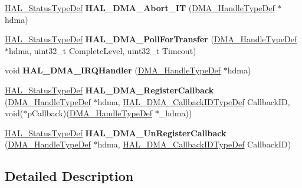 \begin{DoxyCompactItemize}
\hyperlink{stm32f0xx__hal__def_8h_a63c0679d1cb8b8c684fbb0632743478f}{H\+A\+L\+\_\+\+Status\+Type\+Def} {\bfseries H\+A\+L\+\_\+\+D\+M\+A\+\_\+\+Abort\+\_\+\+IT} (\hyperlink{group___d_m_a___exported___types_ga92b907d56a9c29b93d46782a7a04f91e}{D\+M\+A\+\_\+\+Handle\+Type\+Def} $\ast$hdma)
\item 
\mbox{\label{group___d_m_a___exported___functions___group2_ga676b9606af3221a6b7bd7de264809fc7}} 
\hyperlink{stm32f0xx__hal__def_8h_a63c0679d1cb8b8c684fbb0632743478f}{H\+A\+L\+\_\+\+Status\+Type\+Def} {\bfseries H\+A\+L\+\_\+\+D\+M\+A\+\_\+\+Poll\+For\+Transfer} (\hyperlink{group___d_m_a___exported___types_ga92b907d56a9c29b93d46782a7a04f91e}{D\+M\+A\+\_\+\+Handle\+Type\+Def} $\ast$hdma, uint32\+\_\+t Complete\+Level, uint32\+\_\+t Timeout)
\item 
\mbox{\label{group___d_m_a___exported___functions___group2_ga8c8564d06f6d39b702af1c5cbb7dd54a}} 
void {\bfseries H\+A\+L\+\_\+\+D\+M\+A\+\_\+\+I\+R\+Q\+Handler} (\hyperlink{group___d_m_a___exported___types_ga92b907d56a9c29b93d46782a7a04f91e}{D\+M\+A\+\_\+\+Handle\+Type\+Def} $\ast$hdma)
\item 
\mbox{\label{group___d_m_a___exported___functions___group2_gaabec77de08a59c94f2c6265ce7ae8261}} 
\hyperlink{stm32f0xx__hal__def_8h_a63c0679d1cb8b8c684fbb0632743478f}{H\+A\+L\+\_\+\+Status\+Type\+Def} {\bfseries H\+A\+L\+\_\+\+D\+M\+A\+\_\+\+Register\+Callback} (\hyperlink{group___d_m_a___exported___types_ga92b907d56a9c29b93d46782a7a04f91e}{D\+M\+A\+\_\+\+Handle\+Type\+Def} $\ast$hdma, \hyperlink{group___d_m_a___exported___types_gafbe8b2bd9ce2128de6cdc08ccde7e8ad}{H\+A\+L\+\_\+\+D\+M\+A\+\_\+\+Callback\+I\+D\+Type\+Def} Callback\+ID, void($\ast$p\+Callback)(\hyperlink{group___d_m_a___exported___types_ga92b907d56a9c29b93d46782a7a04f91e}{D\+M\+A\+\_\+\+Handle\+Type\+Def} $\ast$\+\_\+hdma))
\item 
\mbox{\label{group___d_m_a___exported___functions___group2_ga87842d3780f0e54c7fb29a003e6b5ac4}} 
\hyperlink{stm32f0xx__hal__def_8h_a63c0679d1cb8b8c684fbb0632743478f}{H\+A\+L\+\_\+\+Status\+Type\+Def} {\bfseries H\+A\+L\+\_\+\+D\+M\+A\+\_\+\+Un\+Register\+Callback} (\hyperlink{group___d_m_a___exported___types_ga92b907d56a9c29b93d46782a7a04f91e}{D\+M\+A\+\_\+\+Handle\+Type\+Def} $\ast$hdma, \hyperlink{group___d_m_a___exported___types_gafbe8b2bd9ce2128de6cdc08ccde7e8ad}{H\+A\+L\+\_\+\+D\+M\+A\+\_\+\+Callback\+I\+D\+Type\+Def} Callback\+ID)
\end{DoxyCompactItemize}


\subsection{Detailed Description}
